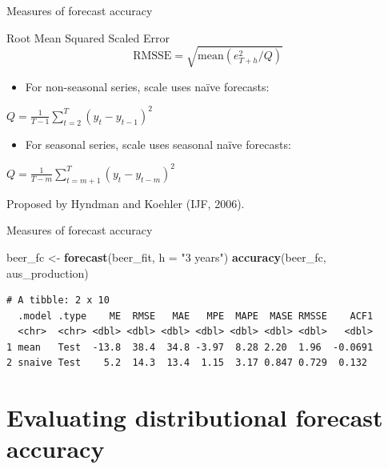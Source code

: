 \documentclass[
  14pt,
  ignorenonframetext,
  aspectratio=169,
]{beamer}
\newenvironment{Shaded}{\begin{snugshade}}{\end{snugshade}}
\newcommand{\AttributeTok}[1]{\textcolor[rgb]{0.13,0.29,0.53}{#1}}
\newcommand{\FunctionTok}[1]{\textcolor[rgb]{0.13,0.29,0.53}{\textbf{#1}}}
\newcommand{\NormalTok}[1]{#1}
\newcommand{\OtherTok}[1]{\textcolor[rgb]{0.56,0.35,0.01}{#1}}
\newcommand{\StringTok}[1]{\textcolor[rgb]{0.31,0.60,0.02}{#1}}
\providecommand{\tightlist}{%
  \setlength{\itemsep}{0pt}\setlength{\parskip}{0pt}}
\renewenvironment{Shaded}{\vspace*{0.15cm}\color{black}\fontsize{10}{10}\sf\begin{snugshade}\color{black}}{\end{snugshade}}
\begin{document}
\begin{frame}{Measures of forecast accuracy}
\protect{}\label{measures-of-forecast-accuracy-4}
\fontsize{13}{15}\sf

\begin{block}{Root Mean Squared Scaled Error}
$$
  \text{RMSSE} = \sqrt{\text{mean}(e^2_{T+h}/Q)}
$$
\end{block}

\begin{itemize}
\tightlist
\item
  For non-seasonal series, scale uses naïve forecasts:
\end{itemize}

\centerline{$Q = \frac{1}{T-1}\displaystyle\sum_{t=2}^T (y_{t}-y_{t-1})^2$}

\begin{itemize}
\tightlist
\item
  For seasonal series, scale uses seasonal naïve forecasts:
\end{itemize}

\centerline{$Q = \frac{1}{T-m}\displaystyle\sum_{t=m+1}^T (y_{t}-y_{t-m})^2$}

Proposed by Hyndman and Koehler (IJF, 2006).
\end{frame}

\begin{frame}[fragile]{Measures of forecast accuracy}
\protect{}\label{measures-of-forecast-accuracy-5}
\fontsize{9.8}{10}\sf

\begin{Shaded}
\begin{Highlighting}[]
\NormalTok{beer\_fc }\OtherTok{\textless{}{-}} \FunctionTok{forecast}\NormalTok{(beer\_fit, }\AttributeTok{h =} \StringTok{"3 years"}\NormalTok{)}
\FunctionTok{accuracy}\NormalTok{(beer\_fc, aus\_production)}
\end{Highlighting}
\end{Shaded}

\begin{verbatim}
# A tibble: 2 x 10
  .model .type    ME  RMSE   MAE   MPE  MAPE  MASE RMSSE    ACF1
  <chr>  <chr> <dbl> <dbl> <dbl> <dbl> <dbl> <dbl> <dbl>   <dbl>
1 mean   Test  -13.8  38.4  34.8 -3.97  8.28 2.20  1.96  -0.0691
2 snaive Test    5.2  14.3  13.4  1.15  3.17 0.847 0.729  0.132 
\end{verbatim}
\end{frame}

\section{Evaluating distributional forecast
accuracy}\label{evaluating-distributional-forecast-accuracy}
\end{document}
